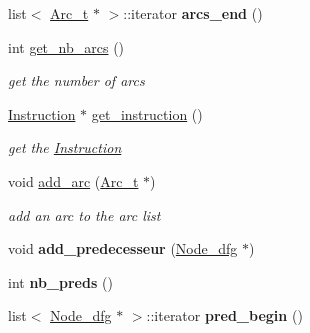 \begin{DoxyCompactItemize}
\item 
\hypertarget{classNode__dfg_a5a49217bcb16aaf7e94e4e156d9a9d53}{list$<$ \hyperlink{structArc__t}{\-Arc\-\_\-t} $\ast$ $>$\-::iterator {\bfseries arcs\-\_\-end} ()}\label{classNode__dfg_a5a49217bcb16aaf7e94e4e156d9a9d53}

\item 
\hypertarget{classNode__dfg_a85d42a5cc1d6feacf403a8569a813074}{int \hyperlink{classNode__dfg_a85d42a5cc1d6feacf403a8569a813074}{get\-\_\-nb\-\_\-arcs} ()}\label{classNode__dfg_a85d42a5cc1d6feacf403a8569a813074}

\begin{DoxyCompactList}\small\item\em get the number of arcs \end{DoxyCompactList}\item 
\hypertarget{classNode__dfg_a8f20c21a0ffb2e224cc426148362c249}{\hyperlink{classInstruction}{\-Instruction} $\ast$ \hyperlink{classNode__dfg_a8f20c21a0ffb2e224cc426148362c249}{get\-\_\-instruction} ()}\label{classNode__dfg_a8f20c21a0ffb2e224cc426148362c249}

\begin{DoxyCompactList}\small\item\em get the \hyperlink{classInstruction}{\-Instruction} \end{DoxyCompactList}\item 
\hypertarget{classNode__dfg_a2fa3283cfba68ea72294810c6e39be61}{void \hyperlink{classNode__dfg_a2fa3283cfba68ea72294810c6e39be61}{add\-\_\-arc} (\hyperlink{structArc__t}{\-Arc\-\_\-t} $\ast$)}\label{classNode__dfg_a2fa3283cfba68ea72294810c6e39be61}

\begin{DoxyCompactList}\small\item\em add an arc to the arc list \end{DoxyCompactList}\item 
\hypertarget{classNode__dfg_a8cc89b32dbe15bcf399725955a643551}{void {\bfseries add\-\_\-predecesseur} (\hyperlink{classNode__dfg}{\-Node\-\_\-dfg} $\ast$)}\label{classNode__dfg_a8cc89b32dbe15bcf399725955a643551}

\item 
\hypertarget{classNode__dfg_adef5e6e3362133f6adb38d404c8d8cf6}{int {\bfseries nb\-\_\-preds} ()}\label{classNode__dfg_adef5e6e3362133f6adb38d404c8d8cf6}

\item 
\hypertarget{classNode__dfg_a769af0d7836679d6ee9abcc55d399887}{list$<$ \hyperlink{classNode__dfg}{\-Node\-\_\-dfg} $\ast$ $>$\-::iterator {\bfseries pred\-\_\-begin} ()}\label{classNode__dfg_a769af0d7836679d6ee9abcc55d399887}


\end{DoxyCompactItemize}
